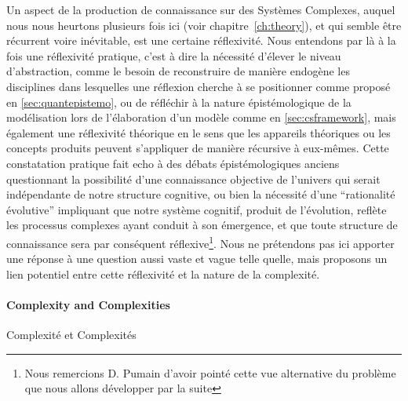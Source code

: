 



Un aspect de la production de connaissance sur des Systèmes Complexes, auquel nous nous heurtons plusieurs fois ici (voir chapitre~\ref{ch:theory}), et qui semble être récurrent voire inévitable, est une certaine réflexivité. Nous entendons par là à la fois une réflexivité pratique, c'est à dire la nécessité d'élever le niveau d'abstraction, comme le besoin de reconstruire de manière endogène les disciplines dans lesquelles une réflexion cherche à se positionner comme proposé en \ref{sec:quantepistemo}, ou de réfléchir à la nature épistémologique de la modélisation lors de l'élaboration d'un modèle comme en \ref{sec:csframework}, mais également une réflexivité théorique en le sens que les appareils théoriques ou les concepts produits peuvent s'appliquer de manière récursive à eux-mêmes. Cette constatation pratique fait echo à des débats épistémologiques anciens questionnant la possibilité d'une connaissance objective de l'univers qui serait indépendante de notre structure cognitive, ou bien la nécessité d'une ``rationalité évolutive'' impliquant que notre système cognitif, produit de l'évolution, reflète les processus complexes ayant conduit à son émergence, et que toute structure de connaissance sera par conséquent réflexive\footnote{Nous remercions D. Pumain d'avoir pointé cette vue alternative du problème que nous allons développer par la suite}. Nous ne prétendons pas ici apporter une réponse à une question aussi vaste et vague telle quelle, mais proposons un lien potentiel entre cette réflexivité et la nature de la complexité.


\paragraph{Complexity and Complexities}{Complexité et Complexités}

